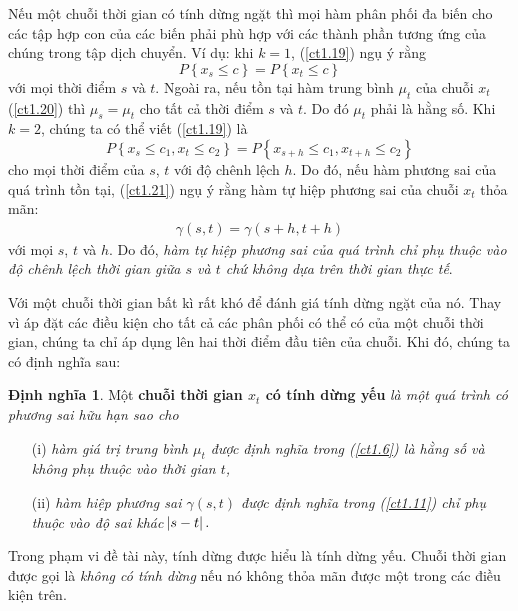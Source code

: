 \documentclass[12pt, a4paper,oneside]{book}
\theoremstyle{definition}
\newtheorem{dn}[theo]{Định nghĩa}
\begin{document}
Nếu một chuỗi thời gian có tính dừng ngặt thì mọi hàm phân phối đa biến cho các tập hợp con của các biến phải phù hợp với các thành phần tương ứng của chúng trong tập dịch chuyển. Ví dụ: khi $k = 1$, (\ref{ct1.19}) ngụ ý rằng
\begin{equation}
P\left\lbrace x_{s} \leqslant  c \right\rbrace = P\left\lbrace x_{t} \leqslant  c \right\rbrace \label{ct1.20}
\end{equation} 
với mọi thời điểm $s$ và $t$. Ngoài ra, nếu tồn tại hàm trung bình $\mu_{t}$ của chuỗi $x_{t}$ (\ref{ct1.20}) thì $\mu_{s}= \mu_{t}$ cho tất cả thời điểm $s$ và $t$. Do đó $\mu_{t}$ phải là hằng số. Khi $k=2$, chúng ta có thể viết (\ref{ct1.19}) là
\begin{equation}
P\left\lbrace x_{s}\leqslant c_{1}, x_{t}\leqslant c_{2}\right\rbrace = P\left\lbrace x_{s+h}\leqslant c_{1}, x_{t+h}\leqslant c_{2}\right\rbrace \label{ct1.21}
\end{equation}
cho mọi thời điểm của $ s $, $ t $ với độ chênh lệch $ h $. Do đó, nếu hàm phương sai của quá trình tồn tại, (\ref{ct1.21}) ngụ ý rằng hàm tự hiệp phương sai của chuỗi $x_{t}$ thỏa mãn:
\begin{align*}
\gamma(s,t)=\gamma(s+h, t+h)
\end{align*}
với mọi $s$, $t$ và $h$. Do đó, \textit{hàm tự hiệp phương sai của quá trình chỉ phụ thuộc vào độ chênh lệch thời gian giữa $s$ và $t$ chứ không dựa trên thời gian thực tế}.

Với một chuỗi thời gian bất kì rất khó để đánh giá tính dừng ngặt của nó. Thay vì áp đặt các điều kiện cho tất cả các phân phối có thể có của một chuỗi thời gian, chúng ta chỉ áp dụng lên hai thời điểm đầu tiên của chuỗi. Khi đó, chúng ta có định nghĩa sau:
\begin{dn}\cite{8} Một \textbf{chuỗi thời gian $x_t$ có tính dừng yếu} \textit{là một quá trình có phương sai hữu hạn sao cho}
	\begin{itemize}
		\item[(i)]\textit{hàm giá trị trung bình $\mu_{t}$ được định nghĩa trong (\ref{ct1.6}) là hằng số và không phụ thuộc vào thời gian $t$,}
		\item[(ii)]\textit{hàm hiệp phương sai $ \gamma(s, t)$ được định nghĩa trong (\ref{ct1.11}) chỉ phụ thuộc vào độ sai khác $ \abs{s-t}.$} \label{dntd}
	\end{itemize}
\end{dn}
Trong phạm vi đề tài này, tính dừng được hiểu là tính dừng yếu. Chuỗi thời gian được gọi là \textit{không có tính dừng} nếu nó không thỏa mãn được một trong các điều kiện trên.
\end{document}
